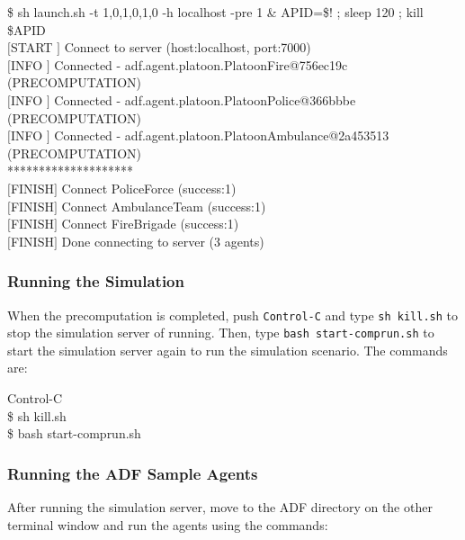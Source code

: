 \documentclass{article}
\begin{document}
\begin{center}
   \begin{tcolorbox}[title=Running Sample Agents, width=.98\linewidth]
    {\ttfamily
    \$ sh launch.sh -t 1,0,1,0,1,0 -h localhost -pre 1 \& APID=\$! ; sleep 120 ;
    kill \$APID\\
    $[$START $]$ Connect to server (host:localhost, port:7000)\\
    $[$INFO  $]$ Connected - adf.agent.platoon.PlatoonFire@756ec19c (PRECOMPUTATION)\\
    $[$INFO  $]$ Connected - adf.agent.platoon.PlatoonPolice@366bbbe (PRECOMPUTATION)\\
    $[$INFO  $]$ Connected - adf.agent.platoon.PlatoonAmbulance@2a453513 (PRECOMPUTATION)\\
    ********************\\
    $[$FINISH$]$ Connect PoliceForce (success:1)\\
    $[$FINISH$]$ Connect AmbulanceTeam (success:1)\\
    $[$FINISH$]$ Connect FireBrigade (success:1)\\
    $[$FINISH$]$ Done connecting to server (3 agents)
    }
  \end{tcolorbox}
\end{center}
\subsubsection{Running the Simulation}
When the precomputation is completed, push \texttt{Control-C} and type \texttt{sh kill.sh} to stop the simulation server of running. Then, type \texttt{bash start-comprun.sh} to start the simulation server again to run the simulation scenario. The commands are:

\begin{center}
   \begin{tcolorbox}[title=Running Simulation Server, width=.98\linewidth]
    {\ttfamily
    Control-C\\
    \$ sh kill.sh\\
    \$ bash start-comprun.sh
    }
  \end{tcolorbox}
\end{center}

\subsubsection{Running the ADF Sample Agents}
After running the simulation server, move to the ADF directory on the other terminal window and run the agents using the commands:
\end{document}
